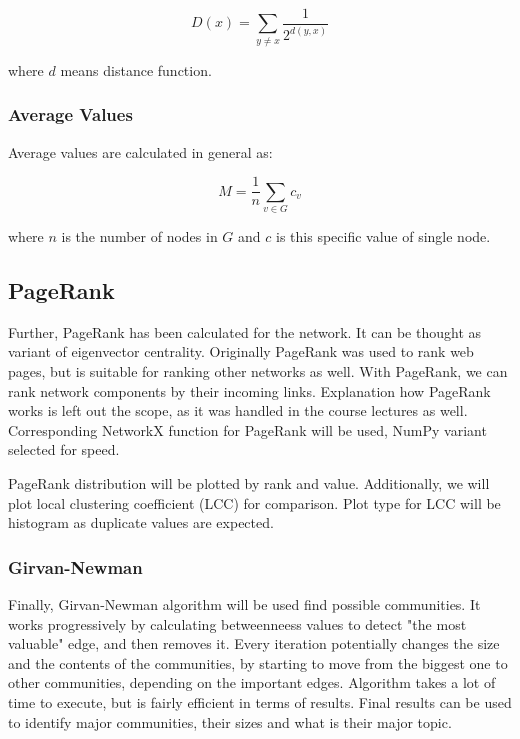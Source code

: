 \begin{equation}
    \label{eq:closeness-centrality}
    D(x)=\sum_{y\neq x}\frac{1}{2^{d(y,x)}}
\end{equation}

where $d$ means distance function.

\subsubsection{Average Values}

Average values are calculated in general as:

\begin{equation}
    \label{eq:average}
    M = \frac{1}{n}\sum_{v \in G} c_v
\end{equation}

\noindent where $n$ is the number of nodes in $G$ and $c$ is this specific value of single node.

\subsection{PageRank}

Further, PageRank has been calculated for the network.
It can be thought as variant of eigenvector centrality.
Originally PageRank was used to rank web pages, but is suitable for ranking other networks as well.\cite{ilprints422}
With PageRank, we can rank network components by their incoming links.
Explanation how PageRank works is left out the scope, as it was handled in the course lectures as well.
Corresponding NetworkX function for PageRank will be used, NumPy variant selected for speed.

PageRank distribution will be plotted by rank and value.
Additionally, we will plot local clustering coefficient (LCC) for comparison.
Plot type for LCC will be histogram as duplicate values are expected.

\subsubsection{Girvan-Newman}

Finally, Girvan-Newman algorithm will be used find possible communities.
It works progressively by calculating betweenneess values to detect "the most valuable" edge, and then removes it.
Every iteration potentially changes the size and the contents of the communities, by starting to move from the biggest one to
other communities, depending on the important edges.
Algorithm takes a lot of time to execute, but is fairly efficient in terms of results.
Final results can be used to identify major communities, their sizes and what is their major topic.